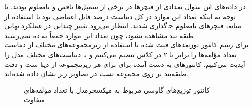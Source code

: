 \documentclass[12pt,onecolumn,a4paper]{article}
\begin{document}
در داده‌های این سوال تعدادی از فیچرها در برخی از سمپل‌ها ناقص و نامعلوم بودند. با توجه به اینکه تعداد این موارد در کل دیتاست درصد قابل اغماضی بود با استفاده از  میانه، فیچرهای نامعلوم جاگذاری شدند. انتظار می‌رود تغییر چندانی در عملکرد نهایی طبقه بند مشاهده نشود، چون تعداد این موارد جمعاً به ده نمی‌رسید.
\\
برای رسم کانتور توزیعذهای فیت شده با استفاده از زیرمجموعه‌های مختلف از دیتاست تعداد مؤلفه‌ها را برابر با ۲ در کلاس  تنظیم می‌کنیم و با دیتا‌ست‌های مختلف مدل را آپدیت می‌کنیم. کانتورهای به دست آمده برای برای هر زیرمجموعه از دیتا ست و دقت طبقه‌بند بر روی مجموعه تست در تصاویر زیر نشان داده شده‌اند.

\begin{figure}[h]
    \centering
    \caption{کانتور توزیع‌های گاوسی مربوط به میکسچرمدل با تعداد مؤلفه‌های متفاوت}
    \label{fig:6}
\end{figure}
\end{document}
